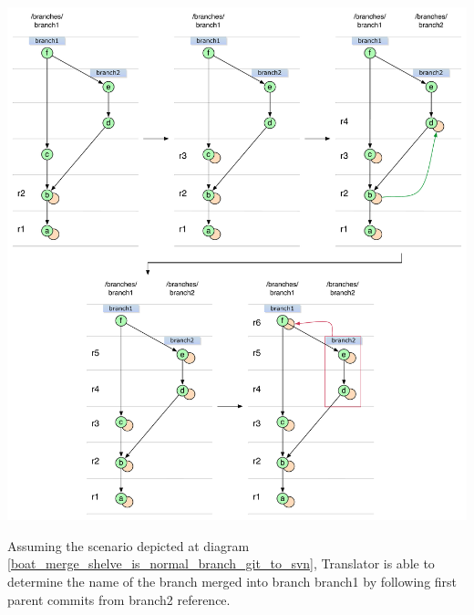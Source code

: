 \begin{center}
\includegraphics[width=\textwidth]{img/diagrams/ml_boat_merge_named_shelve_git_to_svn.pdf}%
\label{boat_merge_named_shelve_git_to_svn}%
\end{center}

Assuming the scenario depicted at diagram \ref{boat_merge_shelve_is_normal_branch_git_to_svn}, Translator is able to determine the name of the branch merged into branch branch1 by following first parent commits from branch2 reference.

